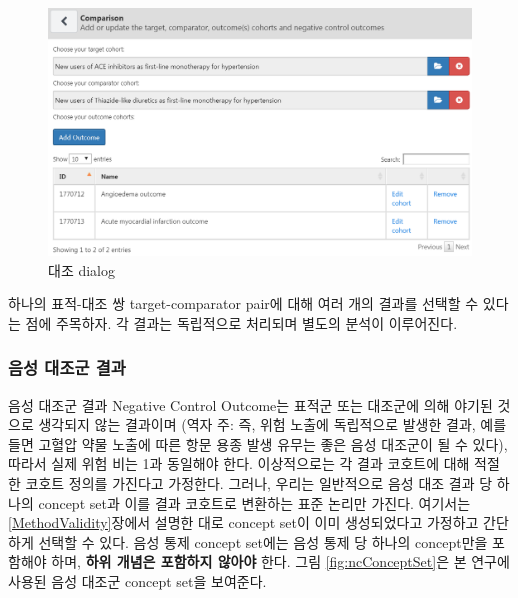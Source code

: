 \documentclass[10.5pt]{book}
\theoremstyle{definition}
\theoremstyle{definition}
\theoremstyle{definition}
\theoremstyle{remark}
\begin{document}
\begin{figure}

{\centering \includegraphics[width=1\linewidth]{images/PopulationLevelEstimation/comparisons} 

}

\caption{대조 dialog}\label{fig:comparisons}
\end{figure}

하나의 표적-대조 쌍 target-comparator pair에 대해 여러 개의 결과를
선택할 수 있다는 점에 주목하자. 각 결과는 독립적으로 처리되며 별도의
분석이 이루어진다.

\subsubsection*{음성 대조군 결과}\label{--}

음성 대조군 결과 Negative Control Outcome는 표적군 또는 대조군에 의해
야기된 것으로 생각되지 않는 결과이며 (역자 주: 즉, 위험 노출에
독립적으로 발생한 결과, 예를 들면 고혈압 약물 노출에 따른 항문 용종 발생
유무는 좋은 음성 대조군이 될 수 있다), 따라서 실제 위험 비는 1과
동일해야 한다. 이상적으로는 각 결과 코호트에 대해 적절한 코호트 정의를
가진다고 가정한다. 그러나, 우리는 일반적으로 음성 대조 결과 당 하나의
concept set과 이를 결과 코호트로 변환하는 표준 논리만 가진다. 여기서는
\ref{MethodValidity}장에서 설명한 대로 concept set이 이미 생성되었다고
가정하고 간단하게 선택할 수 있다. 음성 통제 concept set에는 음성 통제 당
하나의 concept만을 포함해야 하며, \textbf{하위 개념은 포함하지 않아야}
한다. 그림 \ref{fig:ncConceptSet}은 본 연구에 사용된 음성 대조군 concept
set을 보여준다.
\end{document}
